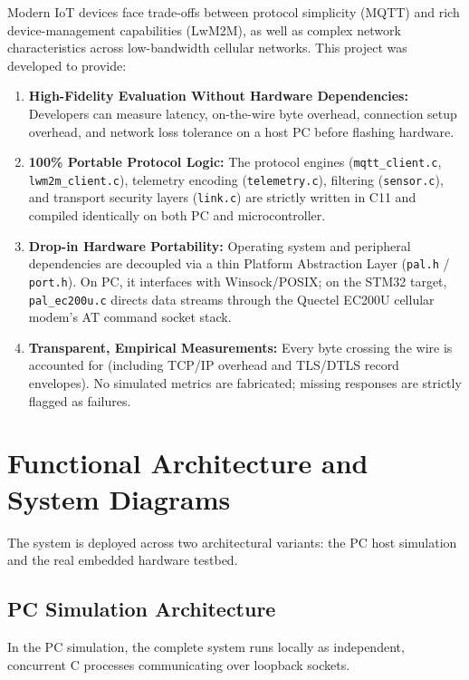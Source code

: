 \documentclass[11pt,a4paper]{article}
\newcommand{\code}[1]{\texttt{#1}}
\begin{document}
Modern IoT devices face trade-offs between protocol simplicity (MQTT) and rich device-management capabilities (LwM2M), as well as complex network characteristics across low-bandwidth cellular networks. This project was developed to provide:
\begin{enumerate}
  \item \textbf{High-Fidelity Evaluation Without Hardware Dependencies:} Developers can measure latency, on-the-wire byte overhead, connection setup overhead, and network loss tolerance on a host PC before flashing hardware.
  \item \textbf{100\% Portable Protocol Logic:} The protocol engines (\code{mqtt\_client.c}, \code{lwm2m\_client.c}), telemetry encoding (\code{telemetry.c}), filtering (\code{sensor.c}), and transport security layers (\code{link.c}) are strictly written in C11 and compiled identically on both PC and microcontroller.
  \item \textbf{Drop-in Hardware Portability:} Operating system and peripheral dependencies are decoupled via a thin Platform Abstraction Layer (\code{pal.h} / \code{port.h}). On PC, it interfaces with Winsock/POSIX; on the STM32 target, \code{pal\_ec200u.c} directs data streams through the Quectel EC200U cellular modem's AT command socket stack.
  \item \textbf{Transparent, Empirical Measurements:} Every byte crossing the wire is accounted for (including TCP/IP overhead and TLS/DTLS record envelopes). No simulated metrics are fabricated; missing responses are strictly flagged as failures.
\end{enumerate}

\section{Functional Architecture and System Diagrams}

The system is deployed across two architectural variants: the PC host simulation and the real embedded hardware testbed.

\subsection{PC Simulation Architecture}

In the PC simulation, the complete system runs locally as independent, concurrent C processes communicating over loopback sockets.
\end{document}

